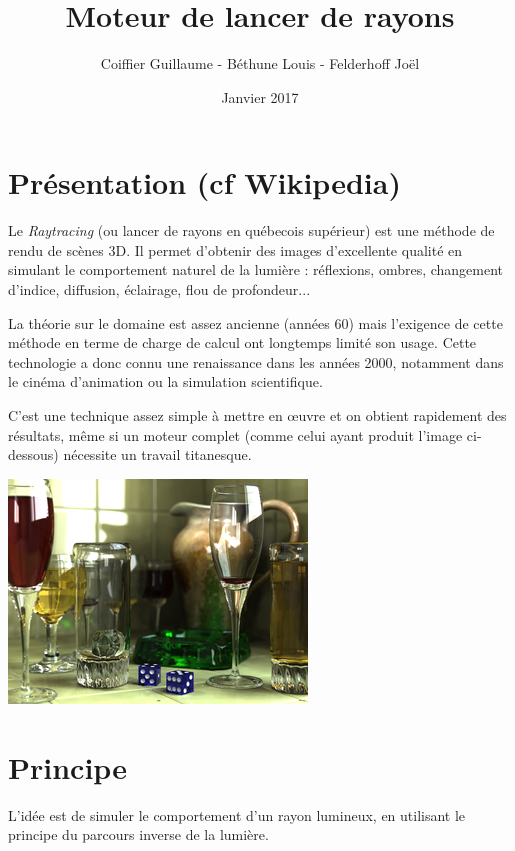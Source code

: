 \documentclass[a4paper, 11pt]{article}
\begin{document}
\title{Moteur de lancer de rayons}
\author{Coiffier Guillaume - Béthune Louis - Felderhoff Joël}
\date{Janvier 2017} 

\maketitle

\section*{Présentation (cf Wikipedia)}
 
Le \textit{Raytracing} (ou lancer de rayons en québecois supérieur) est une méthode de rendu de scènes 3D. Il permet d'obtenir des images d'excellente qualité en simulant le comportement naturel de la lumière : réflexions, ombres, changement d'indice, diffusion, éclairage, flou de profondeur... 
  
La théorie sur le domaine est assez ancienne (années 60) mais l'exigence de cette méthode en terme de charge de calcul ont longtemps limité son usage. Cette technologie a donc connu une renaissance dans les années 2000, notamment dans le cinéma d'animation ou la simulation scientifique.  
  
C'est une technique assez simple à mettre en œuvre et on obtient rapidement des résultats, même si un moteur complet (comme celui ayant produit l'image ci-dessous) nécessite un travail titanesque.

\begin{center}
\includegraphics[scale=1]{300px-Glasses_800_edit.png}
\end{center}
\newpage

\section{Principe}
L'idée est de simuler le comportement d'un rayon lumineux, en utilisant le principe du parcours inverse de la lumière.  
  
\end{document}
